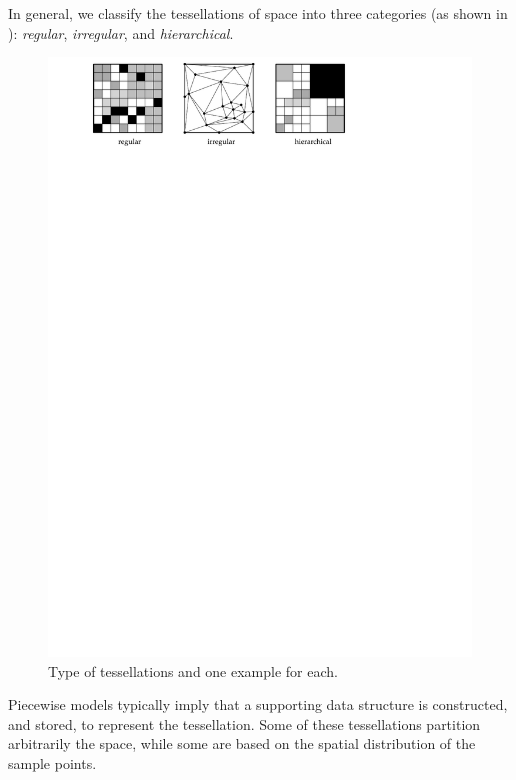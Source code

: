 %

In general, we  classify the tessellations of space into three categories (as shown in ): \emph{regular}, \emph{irregular}, and \emph{hierarchical}.
\begin{figure}
  \centering
  \includegraphics[width=\textwidth]{figs/tesstype}
  \caption{Type of tessellations and one example for each.} 
\label{fig:tesstypes}
\end{figure}

%

Piecewise models typically imply that a supporting data structure is constructed, and stored, to represent the tessellation.
Some of these tessellations partition arbitrarily the space, while some are based on the spatial distribution of the sample points.



